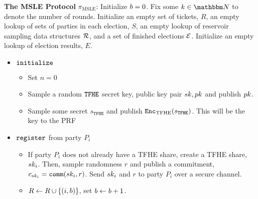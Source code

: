 \centering
\begin{mdframed}
	\textbf{The MSLE Protocol} $\pi_{\text{MSLE}}$:
	Initialize $b = 0$. Fix some $k \in \N$ to denote the number of rounds.
	Initialize an empty set of tickets, $R$, an empty lookup of sets of parties in each election, $S$,
	an empty lookup of reservoir sampling data structures $\mathcal{R}$,
	and a set of finished elections $\mathcal{E}$. Initialize an empty lookup of election results, $E$.

	\begin{itemize}
		\item $\texttt{initialize}$
		      \begin{itemize}
			      \item Set $n = 0$
			      \item Sample a random ${\texttt{TFHE}}$ secret key, public key pair $sk, pk$ and publish $pk$.
			      \item Sample some secret $s_{\texttt{TFHE}}$ and publish $\texttt{Enc}_{\mathrm{TFHE}}(s_{\texttt{TFHE}})$.
			            This will be the key to the PRF
		      \end{itemize}

		\item $\texttt{register}$ from party $P_i$
		      \begin{itemize}
			      \item If party $P_i$ does not already have a TFHE share, create a TFHE share, $sk_i$.
			            Then, sample randomness $r$ and publish a commitment, $c_{sk_i} = \texttt{comm}(sk_i, r)$. Send $sk_i$ and $r$
			            to party $P_i$ over a secure channel.

			      \item $R \gets R \cup \{(i, b)\}$, set $b \gets b + 1$.
		      \end{itemize}


\end{itemize}
\end{mdframed}
